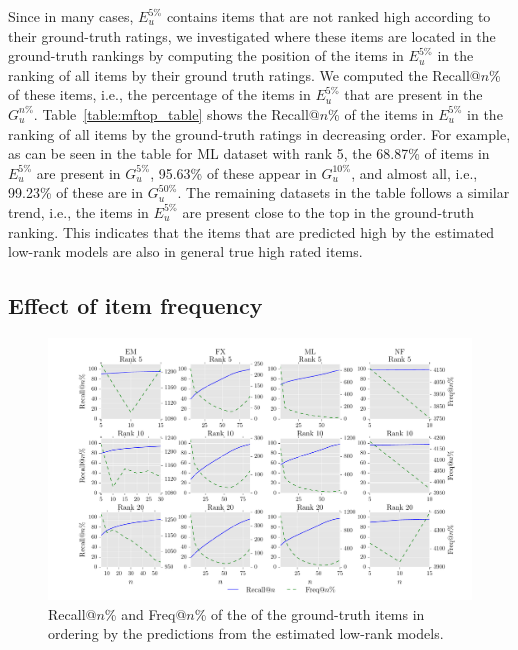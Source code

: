 Since in many cases, $E_{u}^{5\%}$ contains items that are not ranked high
according to their ground-truth ratings, we investigated where these items are
located in the ground-truth rankings by computing the position of the items in 
$E_{u}^{5\%}$ in the ranking of all items by their ground
truth ratings. We computed the Recall@$n$\% of these items,
i.e., the percentage of the items in $E_{u}^{5\%}$ that are present in the $G_{u}^{n\%}$. 
Table~\ref{table:mftop_table} shows the Recall@$n$\%
of the items in $E_{u}^{5\%}$ in the ranking of all items by the ground-truth ratings
in decreasing order. For example, as can be seen in the table for ML dataset
with rank 5, the 68.87\%  of items in $E_{u}^{5\%}$ are present
in $G_{u}^{5\%}$, 95.63\% of these appear in $G_{u}^{10\%}$, and almost all,
i.e., 99.23\% of these are in $G_{u}^{50\%}$. 
The remaining datasets in the table follows a similar trend, i.e., 
the items in $E_{u}^{5\%}$ are present close to the 
top in the ground-truth ranking. 
This indicates that the items that are predicted high by the estimated low-rank models are
also in general true high rated items. 

\subsection*{Effect of item frequency}

\begin{figure}[bt]
  \hspace*{-1.5cm}
  \includegraphics[scale=0.5]{figures/gt_rank_freq} 
  \caption{Recall@$n$\%  and Freq@$n$\% of the \topf of the ground-truth items 
    in ordering by the predictions from the estimated low-rank models.}
  \label{fig:flixmlgtfreq}
\end{figure}

